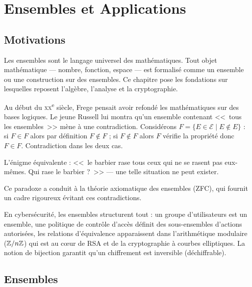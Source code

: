 \chapter{Ensembles et Applications}

\section{Motivations}

Les ensembles sont le langage universel des mathématiques. Tout objet mathématique --- nombre, fonction, espace --- est formalisé comme un ensemble ou une construction sur des ensembles. Ce chapitre pose les fondations sur lesquelles reposent l'algèbre, l'analyse et la cryptographie.

\begin{intuitionbox}
Au début du \textsc{xx}\textsuperscript{e} siècle, Frege pensait avoir refondé les mathématiques sur des bases logiques. Le jeune Russell lui montra qu'un ensemble contenant <<~tous les ensembles~>> mène à une contradiction. Considérons $F = \{E \in \mathcal{E} \mid E \notin E\}$ : si $F \in F$ alors par définition $F \notin F$ ; si $F \notin F$ alors $F$ vérifie la propriété donc $F \in F$. Contradiction dans les deux cas.

L'énigme équivalente : <<~le barbier rase tous ceux qui ne se rasent pas eux-mêmes. Qui rase le barbier ?~>> --- une telle situation ne peut exister.

Ce paradoxe a conduit à la théorie axiomatique des ensembles (ZFC), qui fournit un cadre rigoureux évitant ces contradictions.
\end{intuitionbox}

\begin{intuitionbox}
En cybersécurité, les ensembles structurent tout : un groupe d'utilisateurs est un ensemble, une politique de contrôle d'accès définit des sous-ensembles d'actions autorisées, les relations d'équivalence apparaissent dans l'arithmétique modulaire ($\mathbb{Z}/n\mathbb{Z}$) qui est au c\oe ur de RSA et de la cryptographie à courbes elliptiques. La notion de bijection garantit qu'un chiffrement est inversible (déchiffrable).
\end{intuitionbox}


\section{Ensembles}

